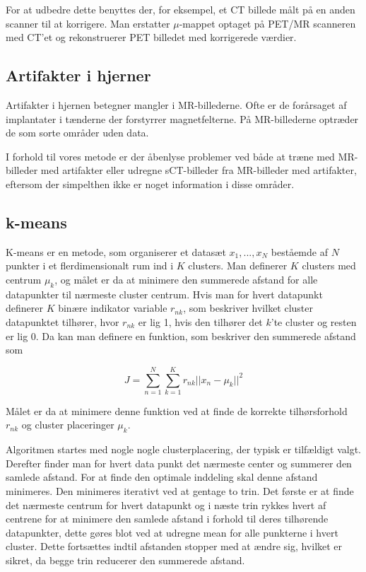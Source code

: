 For at udbedre dette benyttes der, for eksempel, et CT billede målt
på en anden scanner til at korrigere. Man erstatter $\mu$-mappet
optaget på PET/MR scanneren med CT'et og rekonstruerer PET billedet med
korrigerede værdier.

\subsection{Artifakter i hjerner}

Artifakter i hjernen betegner mangler i MR-billederne. Ofte er de
forårsaget af implantater i tænderne der forstyrrer magnetfelterne.
På MR-billederne optræder de som sorte områder uden data.

I forhold til vores metode er der åbenlyse problemer ved både at
træne med MR-billeder med artifakter eller udregne sCT-billeder fra
MR-billeder med artifakter, eftersom der simpelthen ikke er noget
information i disse områder.


\subsection{k-means}

K-means er en metode, som organiserer et datasæt ${x_1,...,x_N}$
beståemde af $N$ punkter i et flerdimensionalt rum ind i $K$ clusters.
Man definerer $K$ clusters med centrum $\mu_k$, og målet er da at
minimere den summerede afstand for alle datapunkter til nærmeste cluster
centrum. Hvis man for hvert datapunkt definerer $K$ binære indikator
variable $r_{nk}$, som beskriver hvilket cluster datapunktet tilhører,
hvor $r_{nk}$ er lig 1, hvis den tilhører det $k$'te cluster og resten
er lig 0. Da kan man definere en funktion, som beskriver den summerede
afstand som

$$
J = \sum_{n=1}^{N} \sum_{k=1}^{K} r_{nk} || x_n - \mu_k ||^2
$$

Målet er da at minimere denne funktion ved at finde de korrekte
tilhørsforhold $r_{nk}$ og cluster placeringer $\mu_k$.

Algoritmen startes med nogle nogle clusterplacering, der typisk
er tilfældigt valgt. Derefter finder man for hvert data punkt det
nærmeste center og summerer den samlede afstand. For at finde den
optimale inddeling skal denne afstand minimeres. Den minimeres iterativt
ved at gentage to trin. Det første er at finde det nærmeste centrum for
hvert datapunkt og i næste trin rykkes hvert af centrene for at minimere
den samlede afstand i forhold til deres tilhørende datapunkter, dette
gøres blot ved at udregne mean for alle punkterne i hvert cluster. Dette
fortsættes indtil afstanden stopper med at ændre sig, hvilket er sikret,
da begge trin reducerer den summerede afstand.

